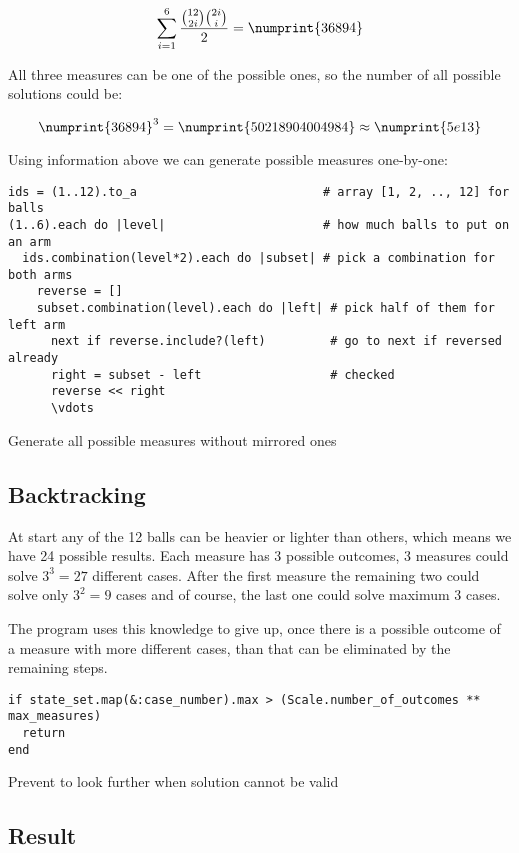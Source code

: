 \documentclass[11pt]{article} %
\begin{document}
\[ \sum_{i=1}^{6} \frac{\binom{12}{2i} \binom{2i}{i}}{2} = \numprint{36894} \]

All three measures can be one of the  possible ones, so the number of all possible solutions could be:

\[ \numprint{36894}^3 = \numprint{50218904004984} \approx \numprint{5e13} \]

Using information above we can generate possible measures one-by-one:

\begin{listing}
\begin{verbatim}
ids = (1..12).to_a                          # array [1, 2, .., 12] for balls
(1..6).each do |level|                      # how much balls to put on an arm
  ids.combination(level*2).each do |subset| # pick a combination for both arms
    reverse = []
    subset.combination(level).each do |left| # pick half of them for left arm
      next if reverse.include?(left)         # go to next if reversed already
      right = subset - left                  # checked
      reverse << right
      \vdots
\end{verbatim}
\caption{Generate all possible measures without mirrored ones}
\end{listing}

\subsection{Backtracking}

At start any of the 12 balls can be heavier or lighter than others, which means we have 24 possible results. Each measure has 3 possible outcomes, 3 measures could solve $3^3 = 27$ different cases. After the first measure the remaining two could solve only $3^2 = 9$ cases and of course, the last one could solve maximum 3 cases.

The program uses this knowledge to give up, once there is a possible outcome of a measure with more different cases, than that can be eliminated by the remaining steps.

\begin{listing}
\begin{verbatim}
if state_set.map(&:case_number).max > (Scale.number_of_outcomes ** max_measures)
  return
end
\end{verbatim}
\caption{Prevent to look further when solution cannot be valid}
\end{listing}

\subsection{Result} \label{one_result}
\end{document}
